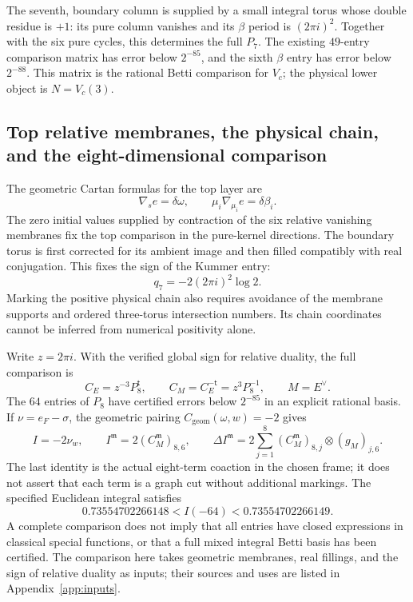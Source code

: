 \documentclass[11pt,a4paper,oneside]{article}
\theoremstyle{plain}
\theoremstyle{definition}
\theoremstyle{remark}
\numberwithin{equation}{section}
\begin{document}
The seventh, boundary column is supplied by a small integral torus whose double residue is $+1$: its pure column vanishes and its $\beta$ period is $(2\pi i)^2$. Together with the six pure cycles, this determines the full $P_7$. The existing $49$-entry comparison matrix has error below $2^{-85}$, and the sixth $\beta$ entry has error below $2^{-88}$. This matrix is the rational Betti comparison for $V_c$; the physical lower object is $N=V_c(3)$.


\subsection{Top relative membranes, the physical chain, and the eight-dimensional comparison}
The geometric Cartan formulas for the top layer are
\begin{equation}
 \nabla_s e=\delta\omega,\qquad
 \mu_i\nabla_{\mu_i}e=\delta\beta_i.
\end{equation}
The zero initial values supplied by contraction of the six relative vanishing membranes fix the top comparison in the pure-kernel directions. The boundary torus is first corrected for its ambient image and then filled compatibly with real conjugation. This fixes the sign of the Kummer entry:
\begin{equation}
 q_7=-2(2\pi i)^2\log2.
\end{equation}
Marking the positive physical chain also requires avoidance of the membrane supports and ordered three-torus intersection numbers. Its chain coordinates cannot be inferred from numerical positivity alone.

Write $z=2\pi i$. With the verified global sign for relative duality, the full comparison is
\begin{equation}
 C_E=z^{-3}P_8^{\mathsf t},\qquad C_M=C_E^{-\mathsf t}=z^3P_8^{-1},
 \qquad M=E^\vee.
\end{equation}
The $64$ entries of $P_8$ have certified errors below $2^{-85}$ in an explicit rational basis. If $\nu=e_F-\sigma$, the geometric pairing $C_{\mathrm{geom}}(\omega,w)=-2$ gives
\begin{equation}
 I=-2\nu_w,\qquad I^{\mathfrak m}=2(C_M^{\mathfrak m})_{8,6},\qquad
 \Delta I^{\mathfrak m}=2\sum_{j=1}^8(C_M^{\mathfrak m})_{8,j}\otimes(g_M)_{j,6}.
\end{equation}
The last identity is the actual eight-term coaction in the chosen frame; it does not assert that each term is a graph cut without additional markings. The specified Euclidean integral satisfies
\begin{equation}
 0.73554702266148<I(-64)<0.73554702266149.
\end{equation}
A complete comparison does not imply that all entries have closed expressions in classical special functions, or that a full mixed integral Betti basis has been certified. The comparison here takes geometric membranes, real fillings, and the sign of relative duality as inputs; their sources and uses are listed in Appendix~\ref{app:inputs}.
\end{document}
